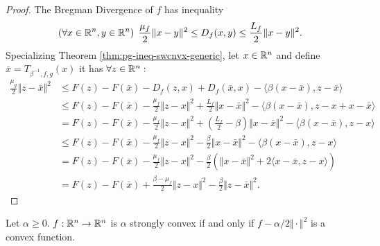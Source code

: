 \documentclass[12pt]{report}
\begin{document}
        \begin{proof}
            The Bregman Divergence of $f$ has inequality 
            \begin{align*}
                \left(\forall x \in \mathbb R^n, y \in \mathbb R^n\right)\; 
                \frac{\mu_f}{2}\Vert x - y\Vert^2 \le D_f(x, y) \le \frac{L_f}{2}\Vert x - y\Vert^2. 
            \end{align*}
            Specializing Theorem \ref{thm:pg-ineq-swcnvx-generic}, let $x \in \mathbb R^n$ and define $\bar x = T_{\beta^{-1}, f, g}(x)$ it has $\forall z \in \mathbb R^n:$
            \begin{align*}
                \frac{\mu_g}{2}\Vert z - \bar x \Vert^2 
                &\le 
                F(z) - F(\bar x) 
                - D_f(z, x) + D_f(\bar x, x) 
                - \langle \beta(x - \bar x), z - \bar x\rangle
                \\
                &\le 
                F(z) - F(\bar x) 
                - \frac{\mu_f}{2}\Vert z - x\Vert^2 
                + \frac{L_f}{2}\Vert x - \bar x\Vert^2
                - \langle \beta(x - \bar x), z - x + x - \bar x\rangle
                \\
                &= 
                F(z) - F(\bar x) 
                - \frac{\mu_f}{2}\Vert z - x\Vert^2 
                + \left(
                    \frac{L_f}{2} - \beta
                \right)\Vert x - \bar x\Vert^2
                - \langle \beta(x - \bar x), z - x\rangle
                \\
                &\le 
                F(z) - F(\bar x) 
                - \frac{\mu_f}{2}\Vert z - x\Vert^2 
                - \frac{\beta}{2}\Vert x - \bar x\Vert^2
                - \langle \beta(x - \bar x), z - x\rangle
                \\
                &= 
                F(z) - F(\bar x) 
                - \frac{\mu_f}{2}\Vert z - x\Vert^2 
                - \frac{\beta}{2}
                \left(
                    \Vert x - \bar x\Vert^2
                    + 2\langle x - \bar x, z - x\rangle
                \right)
                \\
                &= 
                F(z) - F(\bar x) 
                + \frac{\beta - \mu_f}{2}\Vert z - x\Vert^2 
                - \frac{\beta}{2}\Vert z - \bar x\Vert^2. 
            \end{align*}
        \end{proof}
        \begin{definition}\label{def:scnvx}
            Let $\alpha \ge 0$. 
            $f: \mathbb R^n \rightarrow \mathbb R^n$ is $\alpha$ strongly convex if and only if $f - \alpha/2\Vert \cdot\Vert^2$ is a convex function. 
        \end{definition}
\end{document}
